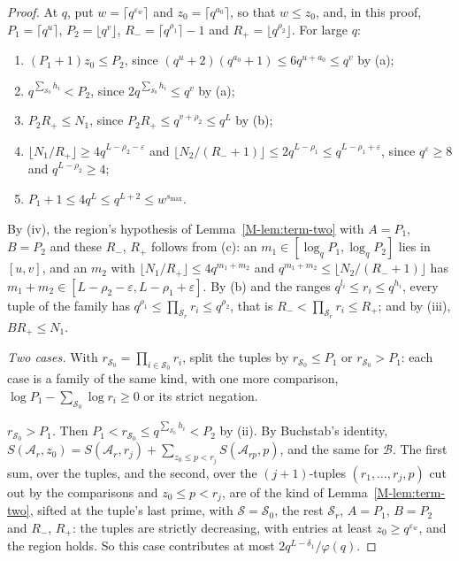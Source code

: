 \documentclass[11pt]{article}
\numberwithin{equation}{section}
\begin{document}
\begin{proof}
At $q$, put $w = \lceil q^{\varepsilon_w} \rceil$ and $z_0 = \lceil q^{a_0} \rceil$, so that $w \le z_0$, and, in this
proof, $P_1 =
\lceil q^u \rceil$, $P_2 = \lfloor q^v \rfloor$, $R_- = \lceil q^{\rho_1} \rceil - 1$ and $R_+ = \lfloor q^{\rho_2}
\rfloor$. For large $q$:
\begin{enumerate}
\item[(i)] $(P_1 + 1) z_0 \le P_2$, since $(q^u + 2)(q^{a_0} + 1) \le 6q^{u + a_0} \le q^v$ by (a);
\item[(ii)] $q^{\sum_{\mathcal S_0} h_i} < P_2$, since $2q^{\sum_{\mathcal S_0} h_i} \le q^v$ by (a);
\item[(iii)] $P_2 R_+ \le N_1$, since $P_2 R_+ \le q^{v + \rho_2} \le q^L$ by (b);
\item[(iv)] $\lfloor N_1/R_+ \rfloor \ge 4q^{L - \rho_2 - \varepsilon}$ and $\lfloor N_2/(R_- + 1) \rfloor \le 2q^{L -
  \rho_1} \le q^{L - \rho_1 + \varepsilon}$, since $q^\varepsilon \ge 8$ and $q^{L - \rho_2} \ge 4$;
\item[(v)] $P_1 + 1 \le 4q^L \le q^{L + 2} \le w^{s_{\max}}$.
\end{enumerate}
By (iv), the region's hypothesis of Lemma~\ref{M-lem:term-two} with $A = P_1$, $B = P_2$ and these $R_-$, $R_+$ follows
from (c): an $m_1 \in [\log_q P_1, \log_q P_2]$ lies in $[u, v]$, and an $m_2$ with $\lfloor N_1/R_+ \rfloor \le 4q^{m_1
+ m_2}$ and $q^{m_1 + m_2} \le \lfloor N_2/(R_- + 1) \rfloor$ has $m_1 + m_2 \in [L - \rho_2 - \varepsilon, L - \rho_1 +
\varepsilon]$. By (b) and the ranges $q^{l_i} \le r_i \le q^{h_i}$, every tuple of the family has $q^{\rho_1} \le
\prod_{\mathcal S_r} r_i \le
q^{\rho_2}$, that is $R_- < \prod_{\mathcal S_r} r_i \le R_+$; and by (iii), $B R_+ \le N_1$.

\emph{Two cases.} With $r_{\mathcal S_0} = \prod_{i \in \mathcal S_0} r_i$, split the tuples by $r_{\mathcal S_0} \le
P_1$ or $r_{\mathcal S_0} > P_1$: each case is a family of the same kind, with one more comparison, $\log P_1 -
\sum_{\mathcal S_0} \log r_i \ge 0$ or its strict negation.

\emph{$r_{\mathcal S_0} > P_1$.} Then $P_1 < r_{\mathcal S_0} \le q^{\sum_{\mathcal S_0} h_i} < P_2$ by (ii). By
Buchstab's identity, $S(\mathcal A_r, z_0) = S(\mathcal A_r, r_j) + \sum_{z_0 \le p < r_j} S(\mathcal A_{rp}, p)$, and
the same for $\mathcal B$. The first sum, over the tuples, and the second, over the $(j + 1)$-tuples $(r_1, \dots, r_j,
p)$ cut out by the comparisons and $z_0 \le p < r_j$, are of the kind of Lemma~\ref{M-lem:term-two}, sifted at the
tuple's last prime, with $\mathcal S = \mathcal S_0$, the rest $\mathcal S_r$, $A = P_1$, $B = P_2$ and $R_-$, $R_+$:
the tuples are strictly decreasing, with entries at least $z_0 \ge q^{\varepsilon_w}$, and the region holds. So this
case contributes at most $2q^{L - \delta_1}/\varphi(q)$.


\end{proof}
\end{document}

